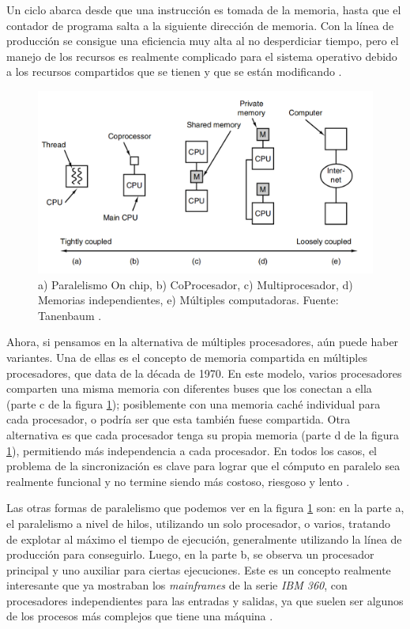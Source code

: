 \documentclass[letterpaper,12pt,oneside]{book}
\begin{document}
        Un ciclo abarca desde que una instrucción es tomada de la memoria, hasta que el contador
		de programa salta a la siguiente dirección de memoria. Con la línea de producción se consigue una eficiencia muy alta al no desperdiciar tiempo, pero el manejo de los recursos es realmente complicado para el sistema operativo debido a los recursos compartidos que
		se tienen y que se están modificando \cite[p.421]{null_essentials_2003}.
		
		\begin{figure}[h]
 			\centering
			\includegraphics[scale=0.3]{media/ParalelismoTanenbaun.png}
			\caption{a) Paralelismo On chip, b) CoProcesador, c) Multiprocesador, d) Memorias independientes, e) Múltiples computadoras.
			Fuente: Tanenbaum \cite{tanenbaum_structured_2013}.}
			\label{fig:Paralelismo}
		\end{figure}
		
		Ahora, si pensamos en la alternativa de múltiples procesadores, aún puede haber variantes. Una de ellas es el concepto de memoria compartida
		en múltiples procesadores, que data de la década de 1970. En este modelo, varios procesadores comparten una misma memoria con diferentes
		buses que los conectan a ella (parte c de la figura \ref{fig:Paralelismo}); posiblemente con una memoria caché individual para cada procesador, o 
		podría ser
		que esta también fuese compartida. Otra alternativa es que cada procesador tenga su propia memoria (parte d de la figura 
		\ref{fig:Paralelismo}), permitiendo más independencia
		a cada procesador. En todos los casos, el problema de la sincronización es clave para lograr que el cómputo en paralelo sea realmente funcional
		y no termine siendo más costoso, riesgoso y lento \cite{null_essentials_2003}.
		
		Las otras formas de paralelismo que podemos ver en la figura \ref{fig:Paralelismo} son: en la parte a, el paralelismo
		a nivel de hilos, utilizando un solo procesador, o varios, tratando de explotar al máximo el tiempo de ejecución, generalmente 
		utilizando la línea de producción para conseguirlo. Luego, en la parte b, se observa un procesador principal y uno auxiliar para ciertas ejecuciones. Este es un concepto realmente interesante que ya mostraban
		los \textit{mainframes} de la serie \textit{IBM 360}, con procesadores independientes para las entradas y salidas, ya que suelen ser algunos de los procesos más
		complejos que tiene una máquina \cite{tanenbaum_structured_2013}.
        
\end{document}
